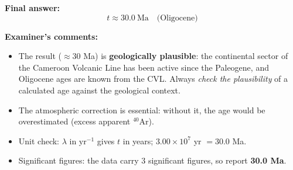 \documentclass[11pt]{article}
\begin{document}
\begin{exoresolu}
\textbf{Final answer:}
\[ \boxed{t \approx 30.0\ \mathrm{Ma} \quad \text{(Oligocene)}} \]

\textbf{Examiner's comments:}
\begin{itemize}
    \item The result ($\approx 30$ Ma) is \textbf{geologically plausible}: the continental sector of the Cameroon Volcanic Line has been active since the Paleogene, and Oligocene ages are known from the CVL. Always \emph{check the plausibility} of a calculated age against the geological context.
    \item The atmospheric correction is essential: without it, the age would be overestimated (excess apparent $^{40}$Ar).
    \item Unit check: $\lambda$ in $\mathrm{yr^{-1}}$ gives $t$ in years; $3.00 \times 10^{7}$ yr $= 30.0$ Ma.
    \item Significant figures: the data carry 3 significant figures, so report \textbf{30.0 Ma}.
\end{itemize}
\end{exoresolu}
\end{document}
